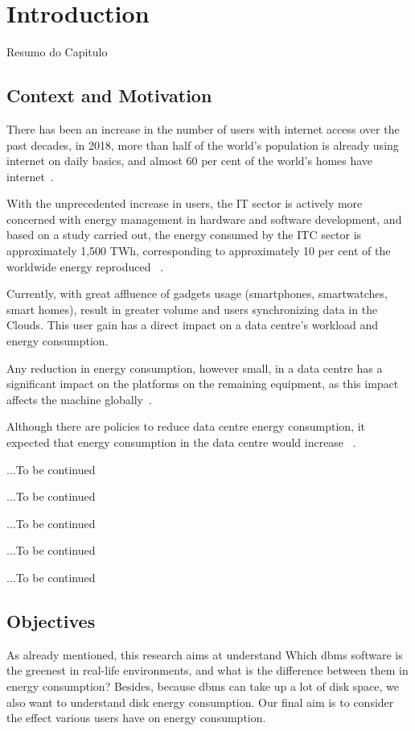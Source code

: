 \newcommand{\novathesis}{\emph{novathesis}}
\newcommand{\novathesisclass}{\texttt{novathesis.cls}}


\chapter{Introduction}
\label{cha:introduction}

Resumo do Capitulo
\section{Context and Motivation}
There has been an increase in the number of users with internet access over the past decades, in 2018, more than half of the world's population is already using internet on daily basics, and almost 60 per cent of the world's homes have internet~\cite{2018stat}.

With the unprecedented increase in users, the IT sector is actively more concerned with energy management in hardware and software development, and based on a study carried out, the energy consumed by the ITC sector is approximately 1,500 TWh, corresponding to approximately 10 per cent of the worldwide energy reproduced ~\cite{CCOAL18}.

Currently, with great affluence of gadgets usage (smartphones, smartwatches, smart homes), result in greater volume and users synchronizing data in the Clouds. This user gain has a direct impact on a data centre's workload and energy consumption.

Any reduction in energy consumption, however small, in a data centre has a significant impact on the platforms on the remaining equipment, as this impact affects the machine globally~\cite{portela2016}.

Although there are policies to reduce data centre energy consumption, it expected that energy consumption in the data centre would increase ~\cite{trends}.

...To be continued

...To be continued

...To be continued

...To be continued

...To be continued

\section{Objectives}

As already mentioned, this research aims at understand Which \gls{dbms} software is the greenest in real-life environments, and what is the difference between them in energy consumption? Besides, because \gls{dbms} can take up a lot of disk space, we also want to understand disk energy consumption. Our final aim is to consider the effect various users have on energy consumption.

